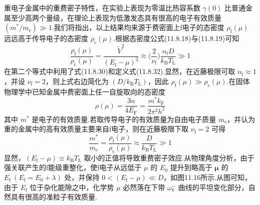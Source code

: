 重电子金属中的重费密子特性，在实验上表现为零温比热容系数 $\gamma(0)$ 比普通金属至少高两个量级，在理论上表现为低激发态具有很高的电子有效质量 $(m^{*}/m_{\mathrm{e}})\gg 1$.我们将指出，以上结果均来源于费密面上f电子的态密度 $\rho_{\mathrm{f}}(\mu)$ 远远高于传导电子的态密度 $\rho_{\mathrm{c}}(\mu)$.根据态密度公式(11.8.18)与(11.8.19)可知
\begin{equation}
  \frac{\rho_{\mathrm{f}}(\mu)}{\rho_{\mathrm{c}}(\mu)}=\frac{\widetilde{V}^{2}}{(E_{\mathrm{f}}-\mu)^{2}}
  \approx\biggl(\frac{2}{\nu_{\mathrm{f}}}\biggr)\frac{n_{\mathrm{f}}D}{k_{\mathrm{B}}T_{\mathrm{L}}}\gg 1
\end{equation}
在第二个等式中利用了式(11.8.30)和定义式(11.8.32).显然，在近藤极限可取 $n_{\mathrm{f}}\approx 1$，并设 $\nu_{\mathrm{f}}=2$，则上式右边简化为 $(D/k_{\mathrm{B}}T_{\mathrm{L}})$，因此 $\rho_{\mathrm{f}}(\mu)\gg\rho_{\mathrm{c}}(\mu)$.在固体物理学中已知金属中费密面上任一自旋取向的态密度
\begin{equation}
  \rho(\mu)=\frac{3n}{4E_{\mathrm{F}}}=\frac{m^{*}k_{\mathrm{F}}}{2\pi^{2}h^{2}}
\end{equation}
其中 $m^{*}$ 是电子的有效质量.若取传导电子的有效质量为自由电子质量 $m_{\mathrm{e}}$，并认为重的金属中的高有效质量主要来自f电子，则在近藤极限下取 $\nu_{\mathrm{f}}=2$ 可得
\begin{equation}
  \frac{m^{*}}{m_{\mathrm{e}}}=\frac{\rho_{\mathrm{f}}(\mu)}{\rho_{\mathrm{c}}(\mu)}
  \approx\frac{D}{k_{\mathrm{B}}T_{\mathrm{L}}}\gg 1
\end{equation}
显然，$(E_{\mathrm{f}}-\mu)\equiv k_{\mathrm{B}}T_{\mathrm{L}}$ 取小的正值将导致重费密子效应.从物理角度分析，由于强关联产生的f能级重整化，使f电子从远低于 $\mu$ 的 $E_{0}$ 提升到略高于 $\boldsymbol{\mu}$ 的 $E_{\mathrm{f}}\ (E_{\mathrm{f}}=E_{0}+\lambda)$ 处，并保持 $0<(E_{\mathrm{f}}-\mu)\ll D$，如图11.16所示.从图可知，由于 $E_{\mathrm{f}}$ 位于杂化能隙之中，化学势 $\mu$ 必然落在下带 $\omega_{k}^{-}$ 曲线的平坦变化部分，自然具有很高的准粒子有效质量.

